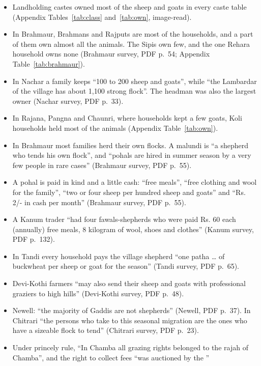 \documentclass[11pt,a4paper]{article}
\newcommand{\cit}[1]{{\small(#1)}}
\begin{document}
\begin{itemize}
\item Landholding castes owned most of the sheep and goats in every caste table
  \cit{Appendix Tables~\ref{tab:class} and~\ref{tab:own}, image-read}.
\item In Brahmaur, Brahmans and Rajputs are most of the households, and a part
  of them own almost all the animals. The Sipis own few, and the one Rehara
  household owns none \cit{Brahmaur survey, PDF p.~54; Appendix
  Table~\ref{tab:brahmaur}}.
\item In Nachar a family keeps \enquote{100 to 200 sheep and goats}, while
  \enquote{the Lambardar of the village has about 1,100 strong flock}. The
  headman was also the largest owner \cit{Nachar survey, PDF p.~33}.
\item In Rajana, Pangna and Chaunri, where households kept a few goats, Koli
  households held most of the animals \cit{Appendix Table~\ref{tab:own}}.
\item In Brahmaur most families herd their own flocks. A malundi is \enquote{a
  shepherd who tends his own flock}, and \enquote{pohals are hired in summer
  season by a very few people in rare cases} \cit{Brahmaur survey, PDF
  p.~55}.
\item A pohal is paid in kind and a little cash: \enquote{free meals},
  \enquote{free clothing and wool for the family}, \enquote{two or four sheep
  per hundred sheep and goats} and \enquote{Rs. 2/- in cash per month}
  \cit{Brahmaur survey, PDF p.~55}.
\item A Kanum trader \enquote{had four fawals-shepherds who were paid Rs. 60
  each (annually) free meals, 8 kilogram of wool, shoes and clothes}
  \cit{Kanum survey, PDF p.~132}.
\item In Tandi every household pays the village shepherd \enquote{one patha
  \dots{} of buckwheat per sheep or goat for the season} \cit{Tandi survey,
  PDF p.~65}.
\item Devi-Kothi farmers \enquote{may also send their sheep and goats with
  professional graziers to high hills} \cit{Devi-Kothi survey, PDF p.~48}.
\item Newell: \enquote{the majority of Gaddis are not shepherds} \cit{Newell,
  PDF p.~37}. In Chitrari \enquote{the persons who take to this seasonal
  migration are the ones who have a sizeable flock to tend} \cit{Chitrari
  survey, PDF p.~23}.
\item Under princely rule, \enquote{In Chamba all grazing rights belonged to the
  rajah of Chamba}, and the right to collect fees \enquote{was auctioned by the
}
\end{itemize}
\end{document}
